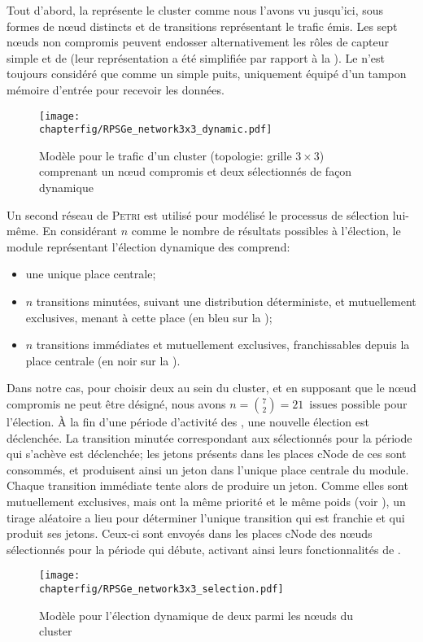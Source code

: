 Tout d'abord, la  représente le cluster comme nous l'avons vu jusqu'ici, sous formes de nœud distincts et de transitions représentant le trafic émis.
Les sept nœuds non compromis peuvent endosser alternativement les rôles de capteur simple et de \cn (leur représentation a été simplifiée par rapport à la ).
Le \ch n'est toujours considéré que comme un simple puits, uniquement équipé d'un tampon mémoire d'entrée pour recevoir les données.
\begin{figure}[!b]
    \centering
    \texttt{[image: \\chapterfig/RPSGe\_network3x3\_dynamic.pdf]}
    \caption{Modèle \rpsge pour le trafic d'un cluster (topologie: grille $3\times3$) comprenant un nœud compromis et deux \cns sélectionnés de façon dynamique}\label{sa:fig:petridyn}
\end{figure}

Un second réseau de \textsc{Petri} est utilisé pour modélisé le processus de sélection lui-même.
En considérant $n$ comme le nombre de résultats possibles à l'élection, le module représentant l'élection dynamique des \cns comprend:
\begin{itemize}
    \item une unique place centrale;
    \item $n$ transitions minutées, suivant une distribution déterministe, et mutuellement exclusives, menant à cette place (en bleu sur la );
    \item $n$ transitions immédiates et mutuellement exclusives, franchissables depuis la place centrale (en noir sur la ).
\end{itemize}
Dans notre cas, pour choisir deux \cns au sein du cluster, et en supposant que le nœud compromis ne peut être désigné, nous avons $n=\binom{7}{2}=21$~issues possible pour l'élection.
À la fin d'une période d'activité des \cns, une nouvelle élection est déclenchée.
La transition minutée correspondant aux \cns sélectionnés pour la période qui s'achève est déclenchée; les jetons présents dans les places \textsf{cNode} de ces \cns sont consommés, et produisent ainsi un jeton dans l'unique place centrale du module.
Chaque transition immédiate tente alors de produire un jeton.
Comme elles sont mutuellement exclusives, mais ont la même priorité et le même poids (voir ), un tirage aléatoire a lieu pour déterminer l'unique transition qui est franchie et qui produit ses jetons.
Ceux-ci sont envoyés dans les places \textsf{cNode} des nœuds sélectionnés pour la période qui débute, activant ainsi leurs fonctionnalités de \cns.
\begin{figure}[!ht]
    \centering
    \texttt{[image: \\chapterfig/RPSGe\_network3x3\_selection.pdf]}
    \caption{Modèle \rpsge pour l'élection dynamique de deux \cns parmi les nœuds du cluster}\label{sa:fig:petrielec}
\end{figure}
